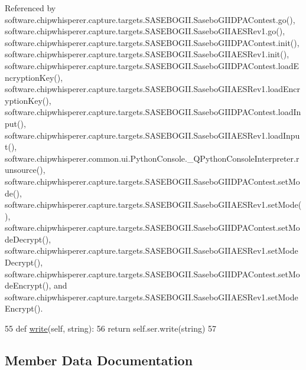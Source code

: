 Referenced by software.\+chipwhisperer.\+capture.\+targets.\+S\+A\+S\+E\+B\+O\+G\+I\+I.\+Sasebo\+G\+I\+I\+D\+P\+A\+Contest.\+go(), software.\+chipwhisperer.\+capture.\+targets.\+S\+A\+S\+E\+B\+O\+G\+I\+I.\+Sasebo\+G\+I\+I\+A\+E\+S\+Rev1.\+go(), software.\+chipwhisperer.\+capture.\+targets.\+S\+A\+S\+E\+B\+O\+G\+I\+I.\+Sasebo\+G\+I\+I\+D\+P\+A\+Contest.\+init(), software.\+chipwhisperer.\+capture.\+targets.\+S\+A\+S\+E\+B\+O\+G\+I\+I.\+Sasebo\+G\+I\+I\+A\+E\+S\+Rev1.\+init(), software.\+chipwhisperer.\+capture.\+targets.\+S\+A\+S\+E\+B\+O\+G\+I\+I.\+Sasebo\+G\+I\+I\+D\+P\+A\+Contest.\+load\+Encryption\+Key(), software.\+chipwhisperer.\+capture.\+targets.\+S\+A\+S\+E\+B\+O\+G\+I\+I.\+Sasebo\+G\+I\+I\+A\+E\+S\+Rev1.\+load\+Encryption\+Key(), software.\+chipwhisperer.\+capture.\+targets.\+S\+A\+S\+E\+B\+O\+G\+I\+I.\+Sasebo\+G\+I\+I\+D\+P\+A\+Contest.\+load\+Input(), software.\+chipwhisperer.\+capture.\+targets.\+S\+A\+S\+E\+B\+O\+G\+I\+I.\+Sasebo\+G\+I\+I\+A\+E\+S\+Rev1.\+load\+Input(), software.\+chipwhisperer.\+common.\+ui.\+Python\+Console.\+\_\+\+Q\+Python\+Console\+Interpreter.\+runsource(), software.\+chipwhisperer.\+capture.\+targets.\+S\+A\+S\+E\+B\+O\+G\+I\+I.\+Sasebo\+G\+I\+I\+D\+P\+A\+Contest.\+set\+Mode(), software.\+chipwhisperer.\+capture.\+targets.\+S\+A\+S\+E\+B\+O\+G\+I\+I.\+Sasebo\+G\+I\+I\+A\+E\+S\+Rev1.\+set\+Mode(), software.\+chipwhisperer.\+capture.\+targets.\+S\+A\+S\+E\+B\+O\+G\+I\+I.\+Sasebo\+G\+I\+I\+D\+P\+A\+Contest.\+set\+Mode\+Decrypt(), software.\+chipwhisperer.\+capture.\+targets.\+S\+A\+S\+E\+B\+O\+G\+I\+I.\+Sasebo\+G\+I\+I\+A\+E\+S\+Rev1.\+set\+Mode\+Decrypt(), software.\+chipwhisperer.\+capture.\+targets.\+S\+A\+S\+E\+B\+O\+G\+I\+I.\+Sasebo\+G\+I\+I\+D\+P\+A\+Contest.\+set\+Mode\+Encrypt(), and software.\+chipwhisperer.\+capture.\+targets.\+S\+A\+S\+E\+B\+O\+G\+I\+I.\+Sasebo\+G\+I\+I\+A\+E\+S\+Rev1.\+set\+Mode\+Encrypt().


\begin{DoxyCode}
55     \textcolor{keyword}{def }\hyperlink{classsoftware_1_1chipwhisperer_1_1capture_1_1targets_1_1simpleserial__readers_1_1serial_1_1SimpleSerial__serial_a5006746c6310fff43b7ab8f496e26704}{write}(self, string):
56         \textcolor{keywordflow}{return} self.ser.write(string)
57 
\end{DoxyCode}


\subsection{Member Data Documentation}
\hypertarget{classsoftware_1_1chipwhisperer_1_1capture_1_1targets_1_1simpleserial__readers_1_1serial_1_1SimpleSerial__serial_afc12ce094b167d327f0fb8768c86ffe5}{}
